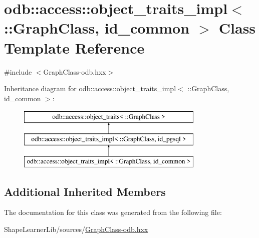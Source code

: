 \hypertarget{classodb_1_1access_1_1object__traits__impl_3_01_1_1_graph_class_00_01id__common_01_4}{}\section{odb\+:\+:access\+:\+:object\+\_\+traits\+\_\+impl$<$ \+:\+:Graph\+Class, id\+\_\+common $>$ Class Template Reference}
\label{classodb_1_1access_1_1object__traits__impl_3_01_1_1_graph_class_00_01id__common_01_4}


{\ttfamily \#include $<$Graph\+Class-\/odb.\+hxx$>$}

Inheritance diagram for odb\+:\+:access\+:\+:object\+\_\+traits\+\_\+impl$<$ \+:\+:Graph\+Class, id\+\_\+common $>$\+:\begin{figure}[H]
\begin{center}
\leavevmode
\includegraphics[height=3.000000cm]{d0/ded/classodb_1_1access_1_1object__traits__impl_3_01_1_1_graph_class_00_01id__common_01_4}
\end{center}
\end{figure}
\subsection*{Additional Inherited Members}


The documentation for this class was generated from the following file\+:\begin{DoxyCompactItemize}
\item 
Shape\+Learner\+Lib/sources/\hyperlink{_graph_class-odb_8hxx}{Graph\+Class-\/odb.\+hxx}\end{DoxyCompactItemize}

